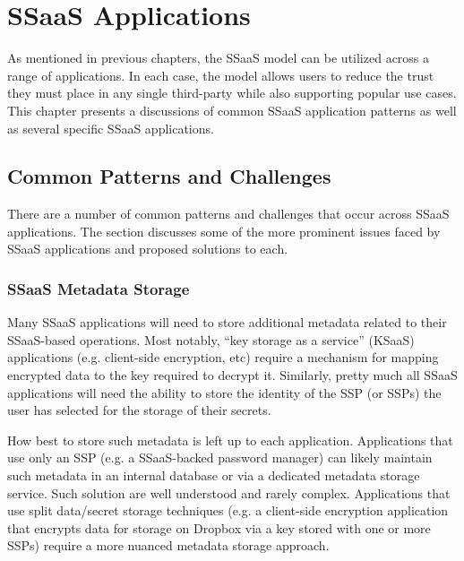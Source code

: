 \chapter{SSaaS Applications}
\label{chap:apps}

As mentioned in previous chapters, the SSaaS model can be utilized
across a range of applications. In each case, the model allows users
to reduce the trust they must place in any single third-party while
also supporting popular use cases. This chapter presents a discussions
of common SSaaS application patterns as well as several specific SSaaS
applications.

\section{Common Patterns and Challenges}

There are a number of common patterns and challenges that occur across
SSaaS applications. The section discusses some of the more prominent
issues faced by SSaaS applications and proposed solutions to each.

\subsection{SSaaS Metadata Storage}

Many SSaaS applications will need to store additional metadata related
to their SSaaS-based operations. Most notably, ``key storage as a
service'' (KSaaS) applications (e.g. client-side encryption, etc)
require a mechanism for mapping encrypted data to the key required to
decrypt it. Similarly, pretty much all SSaaS applications will need
the ability to store the identity of the SSP (or SSPs) the user has
selected for the storage of their secrets.

How best to store such metadata is left up to each application.
Applications that use only an SSP (e.g. a SSaaS-backed password
manager) can likely maintain such metadata in an internal database or
via a dedicated metadata storage service. Such solution are well
understood and rarely complex. Applications that use split data/secret
storage techniques (e.g. a client-side encryption application that
encrypts data for storage on Dropbox via a key stored with one or more
SSPs) require a more nuanced metadata storage approach.

